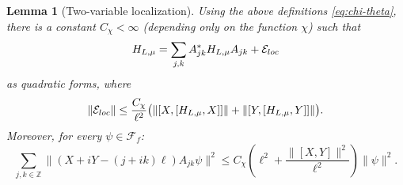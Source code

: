\documentclass[10pt,a4paper]{amsart}
\newtheorem{lemma}{Lemma}
\newcommand{\Z}{\mathbb Z}
\begin{document}
\begin{lemma}[Two-variable localization]\label{lem:abstract-localization}
Using the above definitions \eqref{eq:chi-theta}, there is a constant $C_\chi<\infty$ (depending only on the function $\chi$) such that
\begin{equation}\label{eq:IMS-general}
 H_{L, \mu}=\sum_{j,k}A_{jk}^*H_{L, \mu}A_{jk}+\mathcal{E}_{\rm loc}
\end{equation}
as quadratic forms, where
\begin{equation}\label{eq:Eloc-bound-general}
 \|\mathcal{E}_{\rm loc}\|
 \le \frac{C_\chi}{\ell^2}
 \bigl(\|[X,[H_{L, \mu},X]]\|+\|[Y,[H_{L, \mu}, Y]]\|\bigr).
\end{equation}
Moreover, for every $\psi \in \mathcal{F}_f$:
\begin{equation}\label{eq:Zlocal-general}
 \sum_{j,k \in \Z}\|(X+iY-(j+ik)\ell)A_{jk}\psi\|^2
 \le C_\chi\left(\ell^2+\frac{\|[X,Y]\|^2}{\ell^2}\right)\|\psi\|^2.
\end{equation}
\end{lemma}
\end{document}
